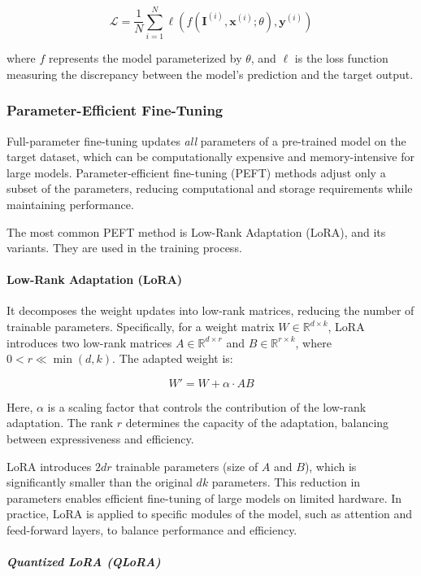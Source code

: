 \documentclass{article}
\newcounter{para}
\begin{document}
\[
\mathcal{L} = \frac{1}{N} \sum_{i=1}^N \ell(f(\mathbf{I}^{(i)}, \mathbf{x}^{(i)}; \theta), \mathbf{y}^{(i)})
\]

where \( f \) represents the model parameterized by \( \theta \), and \( \ell \) is the loss function measuring the discrepancy between the model's prediction and the target output.

\subsubsection{Parameter-Efficient Fine-Tuning} \label{sec:peft}
Full-parameter fine-tuning updates \textit{all} parameters of a pre-trained model on the target dataset, which can be computationally expensive and memory-intensive for large models. Parameter-efficient fine-tuning (PEFT) methods adjust only a subset of the parameters, reducing computational and storage requirements while maintaining performance.

The most common PEFT method is Low-Rank Adaptation (LoRA), and its variants. They are used in the training process.

\paragraph{Low-Rank Adaptation (LoRA)} \label{sec:pre-lora}
It decomposes the weight updates into low-rank matrices, reducing the number of trainable parameters. Specifically, for a weight matrix \( W \in \mathbb{R}^{d \times k} \), LoRA introduces two low-rank matrices \( A \in \mathbb{R}^{d \times r} \) and \( B \in \mathbb{R}^{r \times k} \), where \( 0 < r \ll \min(d, k) \). The adapted weight is:

\[
W' = W + \alpha \cdot A B
\]

Here, \( \alpha \) is a scaling factor that controls the contribution of the low-rank adaptation. The rank \( r \) determines the capacity of the adaptation, balancing between expressiveness and efficiency.

LoRA introduces \( 2dr \) trainable parameters (size of \( A \) and \( B \)), which is significantly smaller than the original \( dk \) parameters. This reduction in parameters enables efficient fine-tuning of large models on limited hardware. In practice, LoRA is applied to specific modules of the model, such as attention and feed-forward layers, to balance performance and efficiency.

\subparagraph{Quantized LoRA (QLoRA)} \label{sec:pre-qlora}
\end{document}
